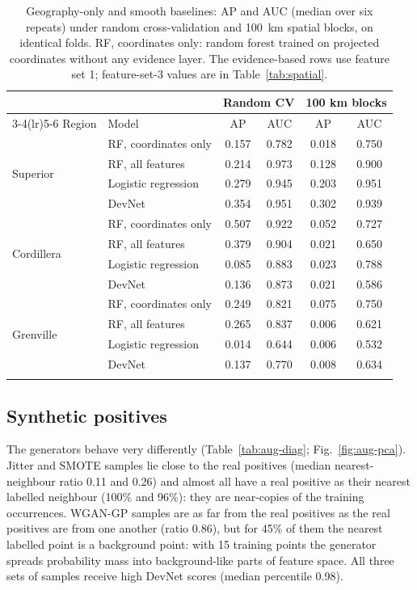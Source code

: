 \documentclass[pdflatex,sn-apa]{sn-jnl}
\begin{document}
\begin{table}[t]
\caption{Geography-only and smooth baselines: AP and AUC (median over six repeats) under random cross-validation and 100~km spatial blocks, on identical folds. RF, coordinates only: random forest trained on projected coordinates without any evidence layer. The evidence-based rows use feature set 1; feature-set-3 values are in Table~\ref{tab:spatial}.}\label{tab:geography}
\footnotesize
\setlength{\tabcolsep}{3pt}
\begin{tabular*}{\textwidth}{@{\extracolsep\fill}llcccc}
\toprule
 & & \multicolumn{2}{c}{Random CV} & \multicolumn{2}{c}{100 km blocks} \\
\cmidrule(lr){3-4}\cmidrule(lr){5-6}
Region & Model & AP & AUC & AP & AUC \\
\midrule
\multirow{4}{*}{Superior} & RF, coordinates only & 0.157 & 0.782 & 0.018 & 0.750 \\
 & RF, all features & 0.214 & 0.973 & 0.128 & 0.900 \\
 & Logistic regression & 0.279 & 0.945 & 0.203 & 0.951 \\
 & DevNet & 0.354 & 0.951 & 0.302 & 0.939 \\
\midrule
\multirow{4}{*}{Cordillera} & RF, coordinates only & 0.507 & 0.922 & 0.052 & 0.727 \\
 & RF, all features & 0.379 & 0.904 & 0.021 & 0.650 \\
 & Logistic regression & 0.085 & 0.883 & 0.023 & 0.788 \\
 & DevNet & 0.136 & 0.873 & 0.021 & 0.586 \\
\midrule
\multirow{4}{*}{Grenville} & RF, coordinates only & 0.249 & 0.821 & 0.075 & 0.750 \\
 & RF, all features & 0.265 & 0.837 & 0.006 & 0.621 \\
 & Logistic regression & 0.014 & 0.644 & 0.006 & 0.532 \\
 & DevNet & 0.137 & 0.770 & 0.008 & 0.634 \\
\botrule
\end{tabular*}
\end{table}

\subsection{Synthetic positives}\label{sec:res-augmentation}

The generators behave very differently (Table~\ref{tab:aug-diag}; Fig.~\ref{fig:aug-pca}). Jitter and SMOTE samples lie close to the real positives (median nearest-neighbour ratio 0.11 and 0.26) and almost all have a real positive as their nearest labelled neighbour (100\% and 96\%): they are near-copies of the training occurrences. WGAN-GP samples are as far from the real positives as the real positives are from one another (ratio 0.86), but for 45\% of them the nearest labelled point is a background point: with 15 training points the generator spreads probability mass into background-like parts of feature space. All three sets of samples receive high DevNet scores (median percentile 0.98).
\end{document}
